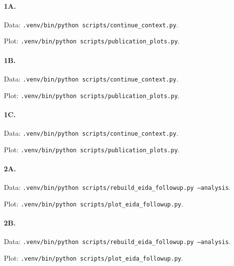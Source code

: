 \paragraph{1A.}
\par Data: \texttt{.venv/bin/python scripts/continue\_context.py}.
\par Plot: \texttt{.venv/bin/python scripts/publication\_plots.py}.
\par{}
\paragraph{1B.}
\par Data: \texttt{.venv/bin/python scripts/continue\_context.py}.
\par Plot: \texttt{.venv/bin/python scripts/publication\_plots.py}.
\par{}
\par{}
\paragraph{1C.}
\par Data: \texttt{.venv/bin/python scripts/continue\_context.py}.
\par Plot: \texttt{.venv/bin/python scripts/publication\_plots.py}.
\par{}
\par{}
\paragraph{2A.}
\par Data: \texttt{.venv/bin/python scripts/rebuild\_eida\_followup.py --analysis}.
\par Plot: \texttt{.venv/bin/python scripts/plot\_eida\_followup.py}.
\par{}
\par{}
\paragraph{2B.}
\par Data: \texttt{.venv/bin/python scripts/rebuild\_eida\_followup.py --analysis}.
\par Plot: \texttt{.venv/bin/python scripts/plot\_eida\_followup.py}.
\par{}
\par{}
